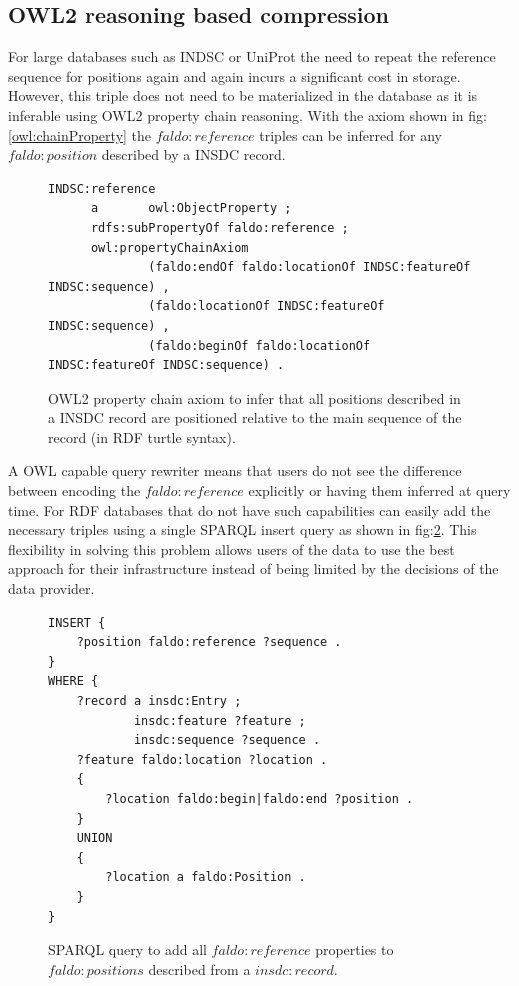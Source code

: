 \subsection*{OWL2 reasoning based compression}
For large databases such as INDSC or UniProt the need to repeat the reference sequence for positions again and again incurs a significant cost in storage. However, this triple does not need to be materialized in the database as it is inferable using OWL2 property chain reasoning.
With the axiom shown in fig:\ref{owl:chainProperty} the $faldo:reference$ triples can be inferred for any $faldo:position$ described by a INSDC record.
\begin{figure}
\begin{verbatim}
INDSC:reference
      a       owl:ObjectProperty ;
      rdfs:subPropertyOf faldo:reference ;
      owl:propertyChainAxiom
              (faldo:endOf faldo:locationOf INDSC:featureOf INDSC:sequence) , 
              (faldo:locationOf INDSC:featureOf INDSC:sequence) , 
              (faldo:beginOf faldo:locationOf INDSC:featureOf INDSC:sequence) .

\end{verbatim}
\caption{OWL2 property chain axiom to infer that all positions described in a INSDC record are positioned relative to the main sequence of the record (in RDF turtle syntax).}
\label{owl:chainProprty}
\end{figure}
A OWL capable query rewriter means that users do not see the difference between encoding the $faldo:reference$ explicitly or having them inferred at query time.
For RDF databases that do not have such capabilities can easily add the necessary triples using a single SPARQL insert query as shown in fig:\ref{sparql:chainProperty}. This flexibility in solving this problem allows users of the data to use the best approach for their infrastructure instead of being limited by the decisions of the data provider.
\begin{figure}
\begin{verbatim}
INSERT {
    ?position faldo:reference ?sequence .
}
WHERE {
    ?record a insdc:Entry ;
            insdc:feature ?feature ;
            insdc:sequence ?sequence .
    ?feature faldo:location ?location .
    {
        ?location faldo:begin|faldo:end ?position .
    }
    UNION
    {
        ?location a faldo:Position .
    }
}
\end{verbatim}
\caption{SPARQL query to add all $faldo:reference$ properties to $faldo:positions$ described from a $insdc:record$.}
\label{sparql:chainProperty}
\end{figure}

